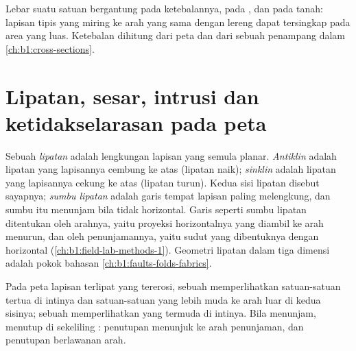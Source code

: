 \begin{remark}\label{rem:b1:geological-maps:width}
Lebar  suatu satuan bergantung pada ketebalannya, pada , dan pada  tanah: lapisan tipis yang miring ke arah yang sama dengan lereng dapat tersingkap pada area yang luas. Ketebalan dihitung dari peta dan dari sebuah penampang dalam \cref{ch:b1:cross-sections}.
\end{remark}

\section{Lipatan, sesar, intrusi dan ketidakselarasan pada peta}

\begin{definition}\label{def:b1:geological-maps:fold}
Sebuah \emph{lipatan} adalah lengkungan lapisan yang semula planar. \emph{Antiklin} adalah lipatan yang lapisannya cembung ke atas (lipatan naik); \emph{sinklin} adalah lipatan yang lapisannya cekung ke atas (lipatan turun). Kedua sisi lipatan disebut sayapnya; \emph{sumbu lipatan} adalah garis tempat lapisan paling melengkung, dan sumbu itu menunjam bila tidak horizontal. Garis seperti sumbu lipatan ditentukan oleh arahnya, yaitu  proyeksi horizontalnya yang diambil ke arah menurun, dan oleh penunjamannya, yaitu sudut yang dibentuknya dengan horizontal (\cref{ch:b1:field-lab-methods-1}). Geometri lipatan dalam tiga dimensi adalah pokok bahasan \cref{ch:b1:faults-folds-fabrics}.
\end{definition}

\begin{proposition}\label{prop:b1:geological-maps:folds}
Pada peta lapisan terlipat yang tererosi, sebuah  memperlihatkan satuan-satuan tertua di intinya dan satuan-satuan yang lebih muda ke arah luar di kedua sisinya; sebuah  memperlihatkan yang termuda di intinya. Bila  menunjam,  menutup di sekeliling : penutupan  menunjuk ke arah penunjaman, dan penutupan  berlawanan arah.
\end{proposition}

